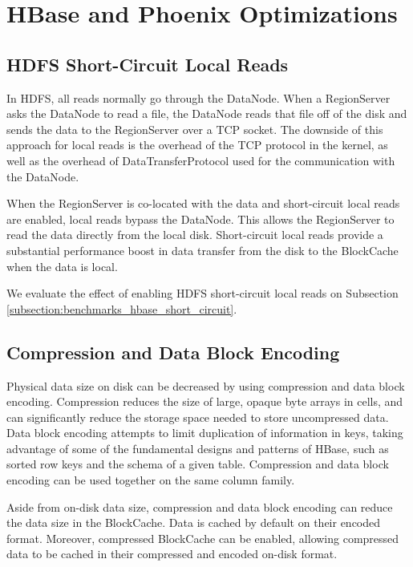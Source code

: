 \chapter{HBase and Phoenix Optimizations}\label{chapter:optimizations}

\section{HDFS Short-Circuit Local Reads}\label{section:optimizations_short_circuit}

In HDFS, all reads normally go through the DataNode. When a RegionServer asks the DataNode to read a file, the DataNode reads that file off of the disk and sends the data to the RegionServer over a TCP socket. The downside of this approach for local reads is the overhead of the TCP protocol in the kernel, as well as the overhead of DataTransferProtocol used for the communication with the DataNode.

When the RegionServer is co-located with the data and short-circuit local reads are enabled, local reads bypass the DataNode. This allows the RegionServer to read the data directly from the local disk. Short-circuit local reads provide a substantial performance boost in data transfer from the disk to the BlockCache when the data is local.

We evaluate the effect of enabling HDFS short-circuit local reads on Subsection \ref{subsection:benchmarks_hbase_short_circuit}.


\section{Compression and Data Block Encoding}\label{section:compression_encoding}

Physical data size on disk can be decreased by using compression and data block encoding. Compression reduces the size of large, opaque byte arrays in cells, and can significantly reduce the storage space needed to store uncompressed data. Data block encoding attempts to limit duplication of information in keys, taking advantage of some of the fundamental designs and patterns of HBase, such as sorted row keys and the schema of a given table. Compression and data block encoding can be used together on the same column family.

Aside from on-disk data size, compression and data block encoding can reduce the data size in the BlockCache. Data is cached by default on their encoded format. Moreover, compressed BlockCache can be enabled, allowing compressed data to be cached in their compressed and encoded on-disk format.

